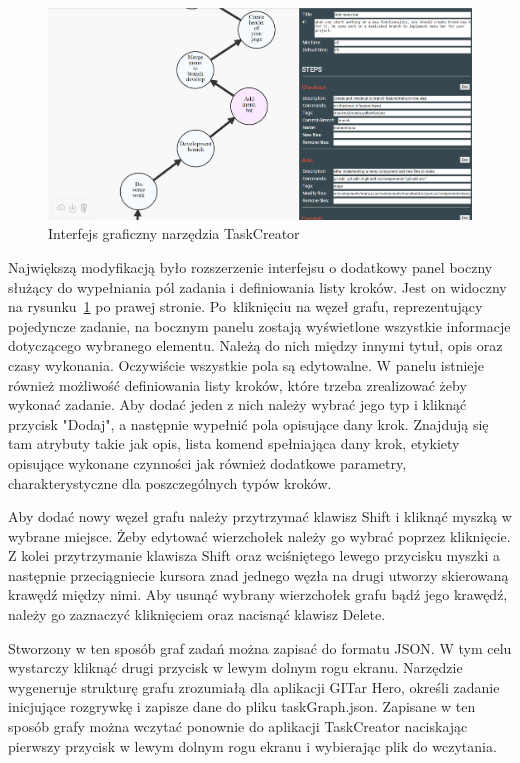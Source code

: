 \documentclass[12pt,a4paper,polish,thesis]{dcsbook}
\begin{document}
{	\begin{figure}
		\centering
		\includegraphics[width=12cm]{graphCreator01}
		\caption{Interfejs graficzny narzędzia TaskCreator}
		\label{fig:taskCreator}
	\end{figure}

	Największą modyfikacją było rozszerzenie interfejsu o dodatkowy panel boczny służący do wypełniania pól zadania i definiowania listy kroków. Jest on widoczny na rysunku~\ref{fig:taskCreator} po prawej stronie. Po~kliknięciu na węzeł grafu, reprezentujący pojedyncze zadanie, na bocznym panelu zostają wyświetlone wszystkie informacje dotyczącego wybranego elementu. Należą do nich między innymi tytuł, opis oraz czasy wykonania. Oczywiście wszystkie pola są edytowalne. W panelu istnieje również możliwość definiowania listy kroków, które trzeba zrealizować żeby wykonać zadanie. Aby dodać jeden z nich należy wybrać jego typ i kliknąć przycisk "Dodaj", a następnie wypełnić pola opisujące dany krok. Znajdują się tam atrybuty takie jak opis, lista komend spełniająca dany krok, etykiety opisujące wykonane czynności jak również dodatkowe parametry, charakterystyczne dla poszczególnych typów kroków.

	Aby dodać nowy węzeł grafu należy przytrzymać klawisz Shift i kliknąć myszką w wybrane miejsce. Żeby edytować wierzchołek należy go wybrać poprzez kliknięcie. Z kolei przytrzymanie klawisza Shift oraz wciśniętego lewego przycisku myszki a następnie przeciągniecie kursora znad jednego węzła na drugi utworzy skierowaną krawędź między nimi. Aby usunąć wybrany wierzchołek grafu bądź jego krawędź, należy go zaznaczyć kliknięciem oraz nacisnąć klawisz Delete.

	Stworzony w ten sposób graf zadań można zapisać do formatu JSON. W tym celu wystarczy kliknąć drugi przycisk w lewym dolnym rogu ekranu. Narzędzie wygeneruje strukturę grafu zrozumiałą dla aplikacji GITar Hero, określi zadanie inicjujące rozgrywkę i zapisze dane do pliku taskGraph.json. Zapisane w ten sposób grafy można wczytać ponownie do aplikacji TaskCreator naciskając pierwszy przycisk w lewym dolnym rogu ekranu i wybierając plik do wczytania.
	
}
\end{document}
